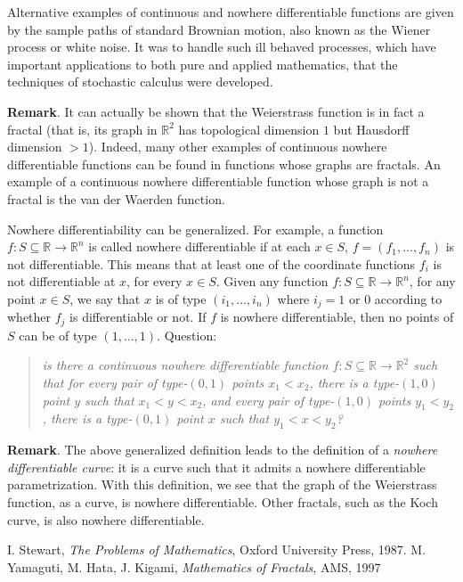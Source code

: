 \documentclass[12pt]{article}
\begin{document}
Alternative examples of continuous and nowhere differentiable functions are given by the sample paths of standard Brownian motion, also known as the Wiener process or white noise. It was to handle such ill behaved processes, which have important applications to both pure and applied mathematics, that the techniques of stochastic calculus were developed.


\textbf{Remark}.  It can actually be shown that the Weierstrass function is in fact a fractal (that is, its graph in $\mathbb{R}^2$ has topological dimension $1$ but Hausdorff dimension $>1$).  Indeed, many other examples of continuous nowhere differentiable functions can be found in functions whose graphs are fractals.  An example of a continuous nowhere differentiable function whose graph is not a fractal is the van der Waerden function.  

Nowhere differentiability can be generalized.  For example, a function $f:S\subseteq \mathbb{R}\to \mathbb{R}^n$ is called nowhere differentiable if at each $x\in S$, $f=(f_1,\ldots,f_n)$ is not differentiable.  This means that at least one of the coordinate functions $f_i$ is not differentiable at $x$, for every $x\in S$.  Given any function $f:S\subseteq \mathbb{R}\to \mathbb{R}^n$, for any point $x\in S$, we say that $x$ is of type $(i_1,\ldots,i_n)$ where $i_j=1$ or $0$ according to whether $f_j$ is differentiable or not.  If $f$ is nowhere differentiable, then no points of $S$ can be of type $(1,\ldots,1)$.  Question: 
\begin{quote}\emph{
is there a continuous nowhere differentiable function $f:S\subseteq \mathbb{R}\to \mathbb{R}^2$ such that for every pair of type-$(0,1)$ points $x_1<x_2$, there is a type-$(1,0)$ point $y$ such that $x_1<y<x_2$, and every pair of type-$(1,0)$ points $y_1<y_2$, there is a type-$(0,1)$ point $x$ such that $y_1<x<y_2$?}
\end{quote}
\textbf{Remark}.  The above generalized definition leads to the definition of a \emph{nowhere differentiable curve}: it is a curve such that it admits a nowhere differentiable parametrization.  With this definition, we see that the graph of the Weierstrass function, as a curve, is nowhere differentiable.  Other fractals, such as the Koch curve, is also nowhere differentiable.

\begin{thebibliography}{9}
 I. Stewart, \emph{The Problems of Mathematics}, 
Oxford University Press, 1987. 
 M. Yamaguti, M. Hata, J. Kigami, \emph{Mathematics of Fractals},
AMS, 1997
\end{thebibliography}
\end{document}
